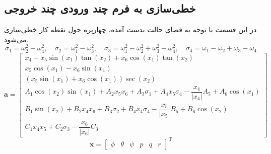 \subsection{خطی‌سازی به فرم چند ورودی چند خروجی}\label{lin_MIMO}
در این قسمت با توجه به فضای حالت بدست آمده، چهارپره حول نقطه کار خطی‌سازی می‌شود.
\begin{equation*}
	\sigma_1 = \omega_2^2-\omega_4^2,\quad \sigma_2 = \omega_1^2-\omega_3^2,
	\quad \sigma_3 = \omega_1^2-\omega_2^2+\omega_3^2-\omega_4^2,\quad \sigma_4 = \omega_1-\omega_2+\omega_3-\omega_4
\end{equation*}
\begin{equation*}
		\boldsymbol a = \begin{bmatrix}
		x_4 + x_5\sin(x_1)\tan(x_2) + x_6\cos(x_1)\tan(x_2)\\
		x_5\cos(x_1)- x_6\sin(x_1)\\
		(x_5\sin(x_1) + x_6\cos(x_1))\sec(x_2)\\
		A_1\cos(x_2)\sin(x_1) + 
		A_2x_5x_6 + A_3\sigma_1+
		A_4x_5\sigma_4- \dfrac{x_4}{\lvert x_4\rvert}A_5+A_6\cos(x_1)\\
		B_1\sin(x_2) + 
		B_2x_4x_6 + B_3\sigma_2+
		B_4x_4\sigma_4- \dfrac{x_5}{\lvert x_5\rvert}B_5 + B_6\cos(x_2)\\
		C_1x_4x_5 + 
		C_2\sigma_3- \dfrac{x_6}{\lvert x_6\rvert}C_3
	\end{bmatrix}
\end{equation*} 
\begin{equation}
	\boldsymbol{x} = \begin{bmatrix} %
		\phi& \theta & \psi & p& q& r
	\end{bmatrix}^\mathrm{T}
\end{equation}
